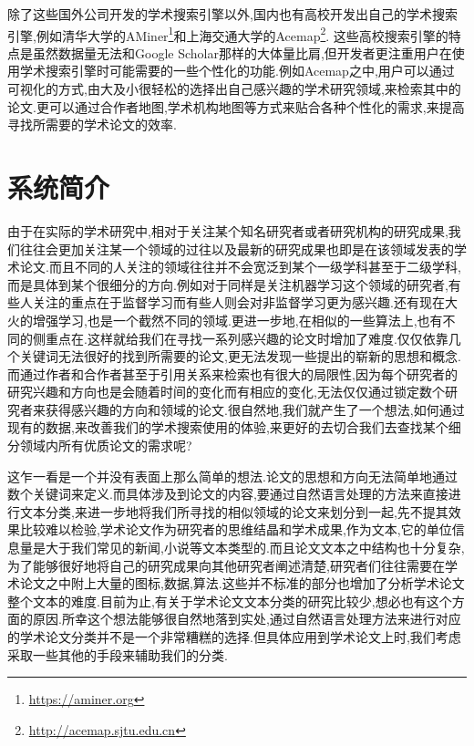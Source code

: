 除了这些国外公司开发的学术搜索引擎以外,国内也有高校开发出自己的学术搜索引擎,例如清华大学的AMiner\footnote{\url{https://aminer.org}}和上海交通大学的Acemap\footnote{\url{http://acemap.sjtu.edu.cn}}. 这些高校搜索引擎的特点是虽然数据量无法和Google Scholar那样的大体量比肩,但开发者更注重用户在使用学术搜索引擎时可能需要的一些个性化的功能.例如Acemap之中,用户可以通过可视化的方式,由大及小很轻松的选择出自己感兴趣的学术研究领域,来检索其中的论文.更可以通过合作者地图,学术机构地图等方式来贴合各种个性化的需求,来提高寻找所需要的学术论文的效率.


\section{系统简介}
\label{sec:nlp-intro}

由于在实际的学术研究中,相对于关注某个知名研究者或者研究机构的研究成果,我们往往会更加关注某一个领域的过往以及最新的研究成果也即是在该领域发表的学术论文.而且不同的人关注的领域往往并不会宽泛到某个一级学科甚至于二级学科,而是具体到某个很细分的方向.例如对于同样是关注机器学习这个领域的研究者,有些人关注的重点在于监督学习而有些人则会对非监督学习更为感兴趣.还有现在大火的增强学习,也是一个截然不同的领域.更进一步地,在相似的一些算法上,也有不同的侧重点在.这样就给我们在寻找一系列感兴趣的论文时增加了难度.仅仅依靠几个关键词无法很好的找到所需要的论文,更无法发现一些提出的崭新的思想和概念.而通过作者和合作者甚至于引用关系来检索也有很大的局限性,因为每个研究者的研究兴趣和方向也是会随着时间的变化而有相应的变化,无法仅仅通过锁定数个研究者来获得感兴趣的方向和领域的论文.很自然地,我们就产生了一个想法,如何通过现有的数据,来改善我们的学术搜索使用的体验,来更好的去切合我们去查找某个细分领域内所有优质论文的需求呢?

这乍一看是一个并没有表面上那么简单的想法.论文的思想和方向无法简单地通过数个关键词来定义.而具体涉及到论文的内容,要通过自然语言处理的方法来直接进行文本分类,来进一步地将我们所寻找的相似领域的论文来划分到一起,先不提其效果比较难以检验,学术论文作为研究者的思维结晶和学术成果,作为文本,它的单位信息量是大于我们常见的新闻,小说等文本类型的.而且论文文本之中结构也十分复杂,为了能够很好地将自己的研究成果向其他研究者阐述清楚,研究者们往往需要在学术论文之中附上大量的图标,数据,算法.这些并不标准的部分也增加了分析学术论文整个文本的难度.目前为止,有关于学术论文文本分类的研究比较少,想必也有这个方面的原因.所幸这个想法能够很自然地落到实处,通过自然语言处理方法来进行对应的学术论文分类并不是一个非常糟糕的选择.但具体应用到学术论文上时,我们考虑采取一些其他的手段来辅助我们的分类.

